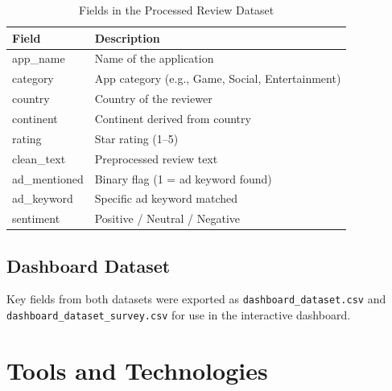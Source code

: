 \documentclass[12pt]{article}
\begin{document}
\begin{table}[H]
\centering
\begin{tabularx}{\textwidth}{lX}
\toprule
\textbf{Field} & \textbf{Description} \\
\midrule
app\_name      & Name of the application \\
category       & App category (e.g., Game, Social, Entertainment) \\
country        & Country of the reviewer \\
continent      & Continent derived from country \\
rating         & Star rating (1--5) \\
clean\_text    & Preprocessed review text \\
ad\_mentioned  & Binary flag (1 = ad keyword found) \\
ad\_keyword    & Specific ad keyword matched \\
sentiment      & Positive / Neutral / Negative \\
\bottomrule
\end{tabularx}
\caption{Fields in the Processed Review Dataset}
\label{tab:review_fields}
\end{table}

\subsection{Dashboard Dataset}

Key fields from both datasets were exported as \texttt{dashboard\_dataset.csv} and\\
\texttt{dashboard\_dataset\_survey.csv} for use in the interactive dashboard.

\section{Tools and Technologies}
\end{document}
